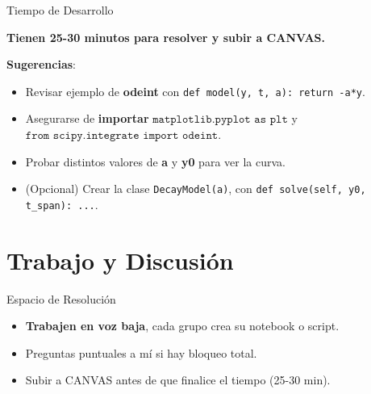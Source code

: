 \documentclass[10pt]{beamer}
\begin{document}
\begin{frame}{Tiempo de Desarrollo}
  \begin{block}{}
    \huge{\textbf{Tienen 25-30 minutos para resolver y subir a CANVAS.}}
  \end{block}
  \vspace{0.3cm}
  \textbf{Sugerencias}:
  \begin{itemize}
    \item Revisar ejemplo de \textbf{odeint} con \texttt{def model(y, t, a): return -a*y}.
    \item Asegurarse de \textbf{importar} \(\texttt{matplotlib.pyplot as plt}\) y \(\texttt{from scipy.integrate import odeint}\).
    \item Probar distintos valores de \textbf{a} y \textbf{y0} para ver la curva.
    \item (Opcional) Crear la clase \texttt{DecayModel(a)}, con \texttt{def solve(self, y0, t\_span): ...}.
  \end{itemize}
\end{frame}

\section{Trabajo y Discusión}

\begin{frame}{Espacio de Resolución}
  \begin{itemize}
    \item \textbf{Trabajen en voz baja}, cada grupo crea su notebook o script.
    \item Preguntas puntuales a mí si hay bloqueo total.
    \item Subir a CANVAS antes de que finalice el tiempo (25-30 min).
  \end{itemize}
\end{frame}
\end{document}
